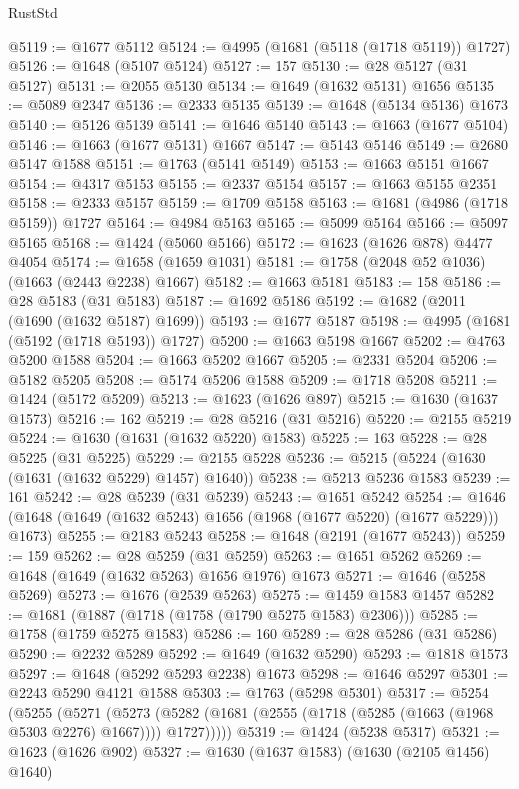 \begin{lexlean}{RustStd}
\begin{coremodule}
{\begin{coremodule}
{{{{{{{{{{{{{{{{{{{{{{{{{{{{{{{{{{{{{{{{{{{{@5119 := @1677 @5112
@5124 := @4995 (@1681 (@5118 (@1718 @5119)) @1727)
@5126 := @1648 (@5107 @5124)
@5127 := 157
@5130 := @28 @5127 (@31 @5127)
@5131 := @2055 @5130
@5134 := @1649 (@1632 @5131) @1656
@5135 := @5089 @2347
@5136 := @2333 @5135
@5139 := @1648 (@5134 @5136) @1673
@5140 := @5126 @5139
@5141 := @1646 @5140
@5143 := @1663 (@1677 @5104)
@5146 := @1663 (@1677 @5131) @1667
@5147 := @5143 @5146
@5149 := @2680 @5147 @1588
@5151 := @1763 (@5141 @5149)
@5153 := @1663 @5151 @1667
@5154 := @4317 @5153
@5155 := @2337 @5154
@5157 := @1663 @5155 @2351
@5158 := @2333 @5157
@5159 := @1709 @5158
@5163 := @1681 (@4986 (@1718 @5159)) @1727
@5164 := @4984 @5163
@5165 := @5099 @5164
@5166 := @5097 @5165
@5168 := @1424 (@5060 @5166)
@5172 := @1623 (@1626 @878) @4477 @4054
@5174 := @1658 (@1659 @1031)
@5181 := @1758 (@2048 @52 @1036) (@1663 (@2443 @2238) @1667)
@5182 := @1663 @5181
@5183 := 158
@5186 := @28 @5183 (@31 @5183)
@5187 := @1692 @5186
@5192 := @1682 (@2011 (@1690 (@1632 @5187) @1699))
@5193 := @1677 @5187
@5198 := @4995 (@1681 (@5192 (@1718 @5193)) @1727)
@5200 := @1663 @5198 @1667
@5202 := @4763 @5200 @1588
@5204 := @1663 @5202 @1667
@5205 := @2331 @5204
@5206 := @5182 @5205
@5208 := @5174 @5206 @1588
@5209 := @1718 @5208
@5211 := @1424 (@5172 @5209)
@5213 := @1623 (@1626 @897)
@5215 := @1630 (@1637 @1573)
@5216 := 162
@5219 := @28 @5216 (@31 @5216)
@5220 := @2155 @5219
@5224 := @1630 (@1631 (@1632 @5220) @1583)
@5225 := 163
@5228 := @28 @5225 (@31 @5225)
@5229 := @2155 @5228
@5236 := @5215 (@5224 (@1630 (@1631 (@1632 @5229) @1457) @1640))
@5238 := @5213 @5236 @1583
@5239 := 161
@5242 := @28 @5239 (@31 @5239)
@5243 := @1651 @5242
@5254 := @1646 (@1648 (@1649 (@1632 @5243) @1656 (@1968 (@1677 @5220) (@1677 @5229))) @1673)
@5255 := @2183 @5243
@5258 := @1648 (@2191 (@1677 @5243))
@5259 := 159
@5262 := @28 @5259 (@31 @5259)
@5263 := @1651 @5262
@5269 := @1648 (@1649 (@1632 @5263) @1656 @1976) @1673
@5271 := @1646 (@5258 @5269)
@5273 := @1676 (@2539 @5263)
@5275 := @1459 @1583 @1457
@5282 := @1681 (@1887 (@1718 (@1758 (@1790 @5275 @1583) @2306)))
@5285 := @1758 (@1759 @5275 @1583)
@5286 := 160
@5289 := @28 @5286 (@31 @5286)
@5290 := @2232 @5289
@5292 := @1649 (@1632 @5290)
@5293 := @1818 @1573
@5297 := @1648 (@5292 @5293 @2238) @1673
@5298 := @1646 @5297
@5301 := @2243 @5290 @4121 @1588
@5303 := @1763 (@5298 @5301)
@5317 := @5254
    (@5255
      (@5271
        (@5273 (@5282 (@1681 (@2555 (@1718 (@5285 (@1663 (@1968 @5303 @2276) @1667)))) @1727)))))
@5319 := @1424 (@5238 @5317)
@5321 := @1623 (@1626 @902)
@5327 := @1630 (@1637 @1583) (@1630 (@2105 @1456) @1640)
}}}}}}}}}}}}}}}}}}}}}}}}}}}}}}}}}}}}}}}}}}}}
\end{coremodule}}
\end{coremodule}
\end{lexlean}
